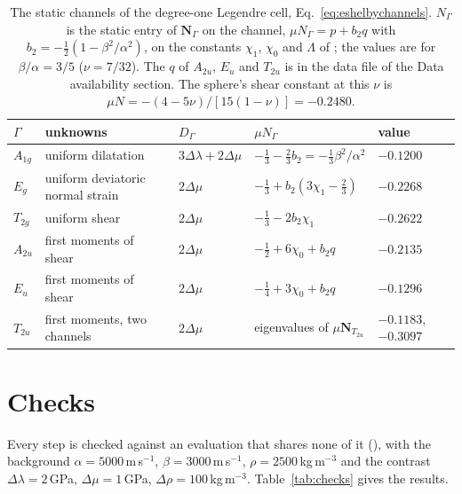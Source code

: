 \documentclass[11pt,a4paper]{article}
\newcommand{\bN}{\mathbf{N}}
\begin{document}
\begin{table}[htbp]
\centering
\caption{The static channels of the degree-one Legendre cell, Eq.~\eqref{eq:eshelbychannels}. $N_\Gamma$ is the
static entry of $\bN_\Gamma$ on the channel, $\mu N_\Gamma=p+b_2q$ with $b_2=-\tfrac12(1-\beta^2/\alpha^2)$, on
the constants $\chi_1$, $\chi_0$ and $\Lambda$ of \citet{NestorCoupling2026}; the values are for
$\beta/\alpha=3/5$ ($\nu=7/32$). The $q$ of $A_{2u}$, $E_u$ and $T_{2u}$ is in the data file of the Data
availability section. The sphere's shear constant at this $\nu$ is
$\mu N=-(4-5\nu)/[15(1-\nu)]=-0.2480$.}\label{tab:channels}
\small
\begin{tabular}{@{}lllll@{}}
\toprule
$\Gamma$ & unknowns & $D_\Gamma$ & $\mu N_\Gamma$ & value \\
\midrule
$A_{1g}$ & uniform dilatation & $3\Delta\lambda+2\Delta\mu$ & $-\tfrac13-\tfrac23b_2=-\tfrac13\beta^2/\alpha^2$ & $-0.1200$ \\
$E_g$ & uniform deviatoric normal strain & $2\Delta\mu$ & $-\tfrac13+b_2(3\chi_1-\tfrac23)$ & $-0.2268$ \\
$T_{2g}$ & uniform shear & $2\Delta\mu$ & $-\tfrac13-2b_2\chi_1$ & $-0.2622$ \\
$A_{2u}$ & first moments of shear & $2\Delta\mu$ & $-\tfrac12+6\chi_0+b_2q$ & $-0.2135$ \\
$E_u$ & first moments of shear & $2\Delta\mu$ & $-\tfrac14+3\chi_0+b_2q$ & $-0.1296$ \\
$T_{2u}$ & first moments, two channels & $2\Delta\mu$ & eigenvalues of $\mu\bN_{T_{2u}}$ & $-0.1183$, $-0.3097$ \\
\bottomrule
\end{tabular}
\end{table}

\section{Checks}\label{sec:checks}

Every step is checked against an evaluation that shares none of it
(), with the background $\alpha=5000$\,m\,s$^{-1}$,
$\beta=3000$\,m\,s$^{-1}$, $\rho=2500$\,kg\,m$^{-3}$ and the contrast $\Delta\lambda=2$\,GPa,
$\Delta\mu=1$\,GPa, $\Delta\rho=100$\,kg\,m$^{-3}$. Table~\ref{tab:checks} gives the results.
\end{document}
